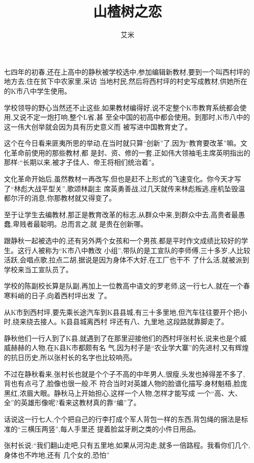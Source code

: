 ﻿\documentclass[12pt]{article}
\title{山楂树之恋}
\author{艾米}
\begin{document}

\pagestyle{fancy}

七四年的初春,还在上高中的静秋被学校选中,参加编辑新教材,要到一个叫西村坪的地方去,住在贫下中农家里,采访
当地村民,然后将西村坪的村史写成教材,供她所在的K市八中学生使用。

学校领导的野心当然还不止这些,如果教材编得好,说不定整个K市教育系统都会使用,又说不定一炮打响,整个L省,甚
至全中国的初高中都会使用。到那时,K市八中的这一伟大创举就会因为具有历史意义而 被写进中国教育史了。

这个在今日看来匪夷所思的举动,在当时就只算``创新''了,因为``教育要改革''嘛。文化革命前使用的那些教材,都
是封、资、修的一套,正如伟大领袖毛主席英明指出的那样:``长期以来,被才子佳人、帝王将相们统治着''。

文化革命开始后,虽然教材一再改写,但也是赶不上形式的飞速变化。你今天才写了``林彪大战平型关'',歌颂林副主
席英勇善战,过几天就传来林彪叛逃,座机坠毁温都尔汗的消息,你那教材就又得变了。

至于让学生去编教材,那正是教育改革的标志,从群众中来,到群众中去,高贵者最愚蠢,卑贱者最聪明。总而言之,就
是贵在创新哪。

跟静秋一起被选中的,还有另外两个女孩和一个男孩,都是平时作文成绩比较好的学生。这行人被称为``K市八中教改
小组'',带队的是工宣队的李师傅,三十多岁,人比较活跃,会唱点歌,拉点二胡,据说是因为身体不大好,在工厂也干不
了什么活,就被派到学校来当工宣队员了。

学校的陈副校长算是队副,再加上一位教高中语文的罗老师,这一行七人,就在一个春寒料峭的日子,向着西村坪出发
了。

从K市到西村坪,要先乘长途汽车到K县县城,有三十多里地,但汽车往往要开个把小时,绕来绕去接人。K县县城离西村
坪还有八、九里地,这段路就靠脚走了。

静秋他们一行人到了K县,就遇到了在那里迎接他们的西村坪张村长,说来也是个威威赫赫的人物,在K县K市都颇有名
气,因为村子是``农业学大寨''的先进村,又有辉煌的抗日历史,所以张村长的名字也比较响亮。

不过在静秋看来,张村长也就是个个子不高的中年男人,很瘦,头发也掉得差不多了,背也有点弓了,脸像也很一般,不
符合当时对英雄人物的脸谱化描写:身材魁梧,脸庞黑红,浓眉大眼。静秋马上开始担心,这样一个人物,怎样才能写成
一个``高、大、全''的英雄形像呢?看来这教材真的靠``编''了。

话说这一行七人,个个把自己的行李打成个军人背包一样的东西,背包绳的捆法是标准的``三横压两竖'',每人手里还
提着脸盆牙刷之类的小件日用品。

张村长说:``我们翻山走吧,只有五里地,如果从河沟走,就多一倍路程。我看你们几个\myrule ,身体也不咋地,还有
几个女的,恐怕\myrule ''
\end{document}
